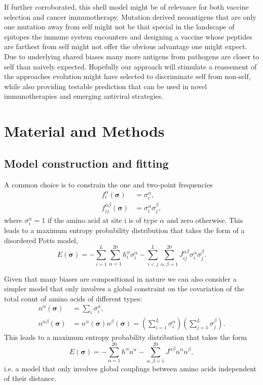 \documentclass[superscriptaddress,twocolumn,pre]{revtex4}
\newcommand{\B}{\boldsymbol}
\newcommand{\<}{\langle}
\renewcommand{\>}{\rangle}
\begin{document}
If further corroborated, this shell model might be of relevance for both vaccine selection and cancer immunotherapy. Mutation derived neoantigens that are only one mutation away from self might not be that special in the landscape of epitopes the immune system encounters and designing a vaccine whose peptides are farthest from self might not offer the obvious advantage one might expect. Due to underlying shared biases many more antigens from pathogens are closer to self than naively expected. Hopefully our approach will stimulate a reassement of the approaches evolution might have selected to discriminate self from non-self, while also providing testable prediction that can be used in novel immunotherapies and emerging antiviral strategies.


\section{Material and Methods}

\subsection{Model construction and fitting}

A common choice is to constrain the one and two-point frequencies
\begin{align}
    f_i^\alpha(\B \sigma) &= \sigma_i^\alpha, \\
    f_{ij}^{\alpha\beta}(\B \sigma) &= \sigma_i^\alpha \sigma_j^\beta,
\end{align}
where $\sigma_i^\alpha = 1$ if the amino acid at site i is of type $\alpha$ and zero otherwise.
This leads to a maximum entropy probability distribution that takes the form of a disordered Potts model,
\begin{equation}
    E(\boldsymbol \sigma) = - \sum_{i=1}^L \sum_{\alpha = 1}^{20} h_i^\alpha \sigma_i^\alpha - \sum_{i<j}^L \sum_{\alpha,\beta = 1}^{20} J_{ij}^{\alpha \beta}  \sigma_i^\alpha \sigma_j^\beta.
\end{equation}

Given that many biases are compositional in nature we can also consider a simpler model that only involves a global constraint on the covariation of the total count of amino acids of different types:
\begin{align}
    n^\alpha(\B \sigma) &= \sum_i \sigma_i^\alpha, \\
    n^{\alpha\beta}(\B \sigma) &= n^\alpha(\B \sigma) n^\beta(\B\sigma) = \left(\sum_{i=1}^L \sigma_i^\alpha\right) \left(\sum_{j=1}^L \sigma_j^\beta\right).
\end{align}
This leads to a maximum entropy probability distribution that takes the form
\begin{equation}
    E(\boldsymbol \sigma) = - \sum_{\alpha=1}^{20} h^\alpha n^\alpha -  \sum_{\alpha,\beta = 1}^{20} J^{\alpha \beta} n^\alpha n^\beta,
\end{equation}
i.e. a model that only involves global couplings between amino acids independent of their distance.
\end{document}
